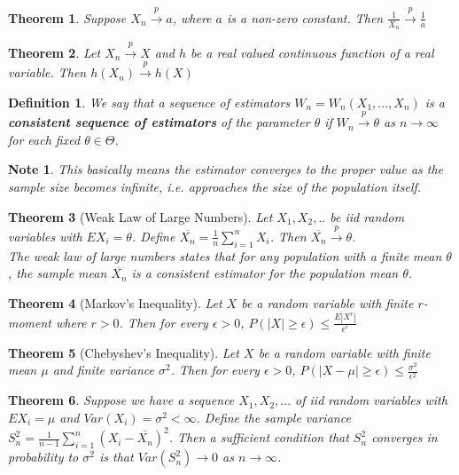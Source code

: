 \documentclass[14pt,twoside]{extreport}
\theoremstyle{dotless}
\newtheorem*{defn}{Definition}
\newtheorem*{thm}{Theorem} %
\newtheorem*{note}{Note} %
\begin{document}
\begin{thm}
    Suppose $X_n \overset{p}{\to} a$, where $a$ is a non-zero constant. Then $\frac{1}{X_n} \overset{p}{\to} \frac{1}{a}$
\end{thm}

\begin{thm}
    Let $X_n \overset{p}{\to} X$ and $h$ be a real valued continuous function of a real variable. Then $h(X_n) \overset{p}{\to} h(X)$
\end{thm}

\begin{defn}
    We say that a sequence of estimators $W_n = W_n(X_1, ..., X_n)$ is a \textbf{consistent sequence of estimators} of the parameter $\theta$ if $W_n \overset{p}{\to} \theta$ as $n \to \infty$ for each fixed $\theta \in \Theta$.
\end{defn}

\begin{note}
    This basically means the estimator converges to the proper value as the sample size becomes infinite, i.e. approaches the size of the population itself.
\end{note}

\begin{thm}[Weak Law of Large Numbers]
    Let $X_1, X_2, ..$ be iid random variables with $EX_i = \theta$. Define $\overline{X_n} = \frac{1}{n} \sum_{i=1}^n X_i$. Then $\overline{X_n} \overset{p}{\to} \theta$. \\
    The weak law of large numbers states that for any population with a finite mean $\theta$, the sample mean $\overline{X_n}$ is a consistent estimator for the population mean $\theta$.
\end{thm}

\begin{thm}[Markov's Inequality]
    Let $X$ be a random variable with finite $r$-moment where $r > 0$. Then for every $\epsilon > 0$, $P(|X| \geq \epsilon) \leq \frac{E|X^r|}{\epsilon^r}$
\end{thm}

\begin{thm}[Chebyshev's Inequality]
    Let $X$ be a random variable with finite mean $\mu$ and finite variance $\sigma^2$. Then for every $\epsilon > 0$, $P(|X-\mu| \geq \epsilon) \leq \frac{\sigma^2}{\epsilon^2}$
\end{thm}

\begin{thm}
    Suppose we have a sequence $X_1, X_2, ...$ of iid random variables with $EX_i = \mu$ and $Var(X_i) = \sigma^2 < \infty$. Define the sample variance $S_n^2 = \frac{1}{n-1} \sum_{i=1}^n (X_i - \overline{X_n})^2$. Then a sufficient condition that $S_n^2$ converges in probability to $\sigma^2$ is that $Var(S_n^2) \to 0$ as $n \to \infty$.
\end{thm}
\end{document}
